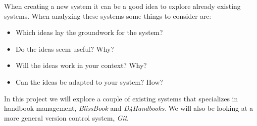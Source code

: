 When creating a new system it can be a good idea to explore already existing systems.%
 When analyzing these systems some things to consider are:

\begin{itemize}
  \item Which ideas lay the groundwork for the system?
  \item Do the ideas seem useful? Why?
  \item Will the ideas work in your context? Why?
  \item Can the ideas be adapted to your system? How?
\end{itemize}


In this project we will explore a couple of existing systems that specializes in handbook management, \textit{BlissBook} and \textit{D4Handbooks}. We will also be looking at a more general version control system, \textit{Git}. %
